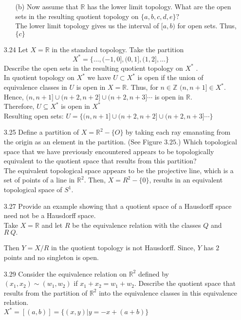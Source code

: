 \documentclass[12pt]{article}
\newcommand{\Z}{\mathds{Z}}
\newcommand{\R}{\mathds{R}}
\begin{document}
\begin{enumerate}
\begin{enumerate}
		\item[(b)] Now assume that $\mathbb { R }$ has the lower limit topology. What are the open sets in the resulting quotient topology on $\{ a , b , c , d , e \} ?$\\
		The lower limit topology gives us the interval of $ [a,b) $ for open sets. Thus, $ \{c\} $
	\end{enumerate}

	\item[3.24] Let $X = \mathbb { R }$ in the standard topology. Take the partition
		\[X ^ { * } = \{ \ldots , ( - 1,0 ] , ( 0,1 ] , ( 1,2 ] , \ldots \}\]
	Describe the open sets in the resulting quotient topology on $X ^ { * }$ .\\
	In quotient topology on $ X^* $ we have $ U\subset X^* $ is open if the union of equivalence classes in $ U $ is open in $ X=\R $. Thus, for $ n\in\Z $ $ (n,n+1]\in X^* $. Hence, $ (n,n+1]\cup(n+2,n+2]\cup(n+2,n+3]\cdots $ is open in $ \R $. \\
	Therefore, $ U\subseteq X^* $ is open in $ X^*$\\
	Resulting open sets: $U =\{(n,n+1]\cup(n+2,n+2]\cup(n+2,n+3]\cdots\} $
	
	\item[3.25] Define a partition of $X = \mathbb { R } ^ { 2 } - \{ O \}$ by taking each ray emanating from the origin as an element in the partition. (See Figure $3.25 .$) Which topological space that we have previously encountered appears to be topologically equivalent to the quotient space that results from this partition?\\
	The equivalent topological space appears to be the projective line, which is a set of points of a line in $ \R^2 $. Then, $ X = R^2-\{0\} $, results in an equivalent topological space of $ S^1 $.
	\item[3.27] Provide an example showing that a quotient space of a Hausdorff space need not be a Hausdorff space.\\
	Take $ X = \R $ and let $ R $ be the equivalence relation with the classes $ Q $ and $ R\ Q. $                          
	
	Then $ Y = X/R $ in the quotient topology is not Hausdorff. Since, $ Y $ has $ 2 $ points and no singleton is open.

	\item[3.29] Consider the equivalence relation on $\mathbb { R } ^ { 2 }$ defined by $\left( x _ { 1 } , x _ { 2 } \right) \sim \left( w _ { 1 } , w _ { 2 } \right)$ if $x _ { 1 } + x _ { 2 } = w _ { 1 } + w _ { 2 } .$ Describe the quotient space that results from the partition of $\mathbb { R } ^ { 2 }$ into the equivalence classes in this equivalence relation.\\
	$ X^* = [(a,b)] = \{(x,y)|y=-x+(a+b)\} $


\end{enumerate}
\end{document}

